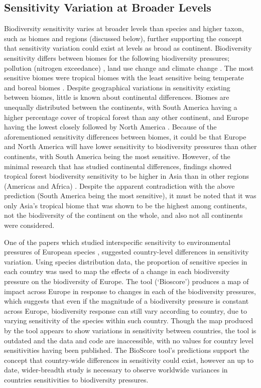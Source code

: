\documentclass[11pt, a4paper, titlepage]{article}
\begin{document}
   	 \subsection*{Sensitivity Variation at Broader Levels}
   	 Biodiversity sensitivity varies at broader levels than species and higher taxon, such as biomes and regions (discussed below), further supporting the concept that sensitivity variation could exist at levels as broad as continent. Biodiversity sensitivity differs between biomes for the following biodiversity pressures; pollution (nitrogen exceedance) \citep{alkemade2009globio3}, land use change and climate change \citep{newbold2020tropical}. The most sensitive biomes were tropical biomes \citep{barlow2016anthropogenic} with the least sensitive being temperate and boreal biomes \citep{newbold2020tropical, cazalis2021mismatch, barlow2016anthropogenic}. Despite geographical variations in sensitivity existing between biomes, little is known about continental differences. Biomes are unequally distributed between the continents, with South America having a higher percentage cover of tropical forest than any other continent, and Europe having the lowest closely followed by North America \citep{wade2003distribution}.  Because of the aforementioned sensitivity differences between biomes, it could be that Europe and North America will have lower sensitivity to biodiversity pressures than other continents, with South America being the most sensitive. However, of the minimal research that has studied continental differences, findings showed tropical forest biodiversity sensitivity to be higher in Asia than in other regions (Americas and Africa) \citep{gibson2011primary}. Despite the apparent contradiction with the above prediction (South America being the most sensitive), it must be noted that it was only Asia's tropical biome that was shown to be the highest among continents, not the biodiversity of the continent on the whole, and also not all continents were considered.
   	 
   	 One of the papers which studied interspecific sensitivity to environmental pressures of European species \citep{louette2010bioscore}, suggested country-level differences in sensitivity variation. Using species distribution data, the proportion of sensitive species in each country was used to map the effects of a change in each biodiversity pressure on the biodiversity of Europe. The tool (`Bioscore') produces a map of impact across Europe in response to changes in each of the biodiversity pressures, which suggests that even if the magnitude of a biodiversity pressure is constant across Europe, biodiversity response can still vary according to country, due to varying sensitivity of the species within such country. Though the map produced by the tool appears to show variations in sensitivity between countries, the tool is outdated and the data and code are inaccessible, with no values for country level sensitivities having been published. The BioScore tool's predictions support the concept that country-wide differences in sensitivity could exist, however an up to date, wider-breadth study is necessary to observe worldwide variances in countries sensitivities to biodiversity pressures. 
   	 
\end{document}
